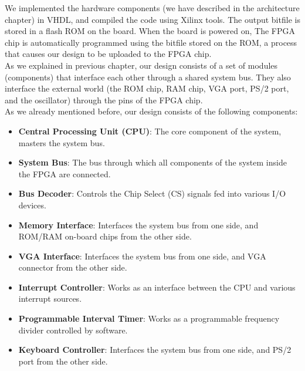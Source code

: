 \documentclass[oneside]{book}
\begin{document}
We implemented the hardware components (we have described in the architecture
chapter) in VHDL, and compiled the code using Xilinx tools. The output
bitfile is stored in a flash ROM on the board. When the board is powered on,
The FPGA chip is automatically programmed using the bitfile stored on the
ROM, a process that causes our design to be uploaded to the FPGA chip.\\

As we explained in previous chapter, our design consists of a set of
modules (components) that interface each other through a shared system bus.
They also interface the external world (the ROM chip, RAM chip, VGA port,
PS/2 port, and the oscillator) through the pins of the FPGA chip.\\

As we already mentioned before, our design consists of the following
components:

\begin{itemize}

\item \textbf{Central Processing Unit (CPU)}: The core
component of the system, masters the system bus.

\item \textbf{System Bus}: The bus through which all components of the
system inside the FPGA are connected.

\item \textbf{Bus Decoder}: Controls the Chip Select (CS) signals
fed into various I/O devices.

\item \textbf{Memory Interface}:
Interfaces the system bus from one side, and ROM/RAM on-board chips from
the other side.

\item \textbf{VGA Interface}:
Interfaces the system bus from one side, and VGA connector from
the other side.

\item \textbf{Interrupt Controller}:
Works as an interface between the CPU and various interrupt sources.

\item \textbf{Programmable Interval Timer}:
Works as a programmable frequency divider controlled by software.

\item \textbf{Keyboard Controller}:
Interfaces the system bus from one side, and PS/2 port from
the other side.

\end{itemize}
\end{document}
